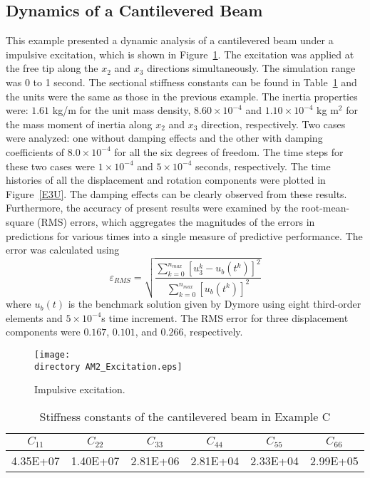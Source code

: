 \documentclass{aiaa-tc}
\def\directory{EPSF/}
\begin{document}
\subsection{Dynamics of a Cantilevered Beam}
This example presented a dynamic analysis of a cantilevered beam under a impulsive excitation, which is shown in Figure~\ref{Impulsive}. The excitation was applied at the free tip along the $x_2$ and $x_3$ directions simultaneously. The simulation range was 0 to 1 second. The sectional stiffness constants can be found in Table~\ref{E3Stiffness} and the units were the same as those in the previous example. The inertia properties were: $1.61$ kg/m for the unit mass density, $8.60 \times 10^{-4}$ and $1.10 \times 10^{-4}$ kg m$^{2}$ for the mass moment of inertia along $x_2$ and $x_3$ direction, respectively.   Two cases were analyzed: one without damping effects and the other with damping coefficients of $8.0 \times  10^{-4}$ for all the six degrees of freedom. The time steps for these two cases were $1 \times 10^{-4}$ and $5 \times 10^{-4}$ seconds, respectively. The time histories of all the displacement and rotation components were plotted in Figure~\ref{E3U}. The damping effects can be clearly observed from these results. Furthermore, the accuracy of present results were examined by the root-mean-square (RMS) errors, which aggregates the magnitudes of the errors in predictions for various times into a single measure of predictive performance. The error was calculated using
\begin{equation}
\varepsilon_{RMS}=\sqrt{\frac{\sum_{k=0}^{n_{max}}[u_3^k-u_b(t^k)]^2}{\sum_{k=0}^{n_{max}}[u_b(t^k)]^2}}
\end{equation} 
where $u_b(t)$ is the benchmark solution given by Dymore using eight third-order elements and $5 \times 10^{-4}$s time increment. The RMS error for three displacement components were $0.167$, $0.101$, and $0.266$, respectively. 
 
\begin{figure}
\centering
\texttt{[image: \\directory AM2\_Excitation.eps]}
\caption{ Impulsive excitation.} 
\label{Impulsive}
\end{figure}

\begin{table}
\caption{\label{E3Stiffness} Stiffness constants of the cantilevered beam in Example C } 
\begin{center}
    \begin{tabular}{| c | c | c | c | c | c |}
    	\hline
    	       $C_{11}$      & $C_{22}$  & $C_{33}$ & $C_{44} $& $C_{55}$ & $C_{66}$ \\ 
	       \hline
    	4.35E+07 & 1.40E+07    &2.81E+06  & 2.81E+04 &2.33E+04 & 2.99E+05 \\ 
	\hline
    \end{tabular}
\end{center}
\end{table} 
\end{document}
